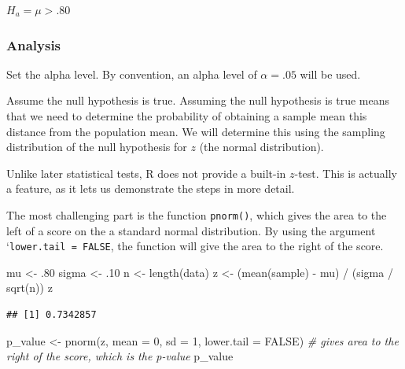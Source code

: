 \documentclass[
]{book}
\newenvironment{Shaded}{\begin{snugshade}}{\end{snugshade}}
\newcommand{\AttributeTok}[1]{\textcolor[rgb]{0.77,0.63,0.00}{#1}}
\newcommand{\CommentTok}[1]{\textcolor[rgb]{0.56,0.35,0.01}{\textit{#1}}}
\newcommand{\ConstantTok}[1]{\textcolor[rgb]{0.00,0.00,0.00}{#1}}
\newcommand{\DecValTok}[1]{\textcolor[rgb]{0.00,0.00,0.81}{#1}}
\newcommand{\FunctionTok}[1]{\textcolor[rgb]{0.00,0.00,0.00}{#1}}
\newcommand{\NormalTok}[1]{#1}
\newcommand{\OtherTok}[1]{\textcolor[rgb]{0.56,0.35,0.01}{#1}}
\newcommand{\SpecialCharTok}[1]{\textcolor[rgb]{0.00,0.00,0.00}{#1}}
\begin{document}
\(H_a = \mu \gt .80\)

\hypertarget{analysis}{%
\subsubsection{Analysis}\label{analysis}}

Set the alpha level. By convention, an alpha level of \(\alpha = .05\) will be used.

Assume the null hypothesis is true. Assuming the null hypothesis is true means that we need to determine the probability of obtaining a sample mean this distance from the population mean. We will determine this using the sampling distribution of the null hypothesis for \(z\) (the normal distribution).

Unlike later statistical tests, R does not provide a built-in \(z\)-test. This is actually a feature, as it lets us demonstrate the steps in more detail.

The most challenging part is the function \texttt{pnorm()}, which gives the area to the left of a score on the a standard normal distribution. By using the argument `\texttt{lower.tail\ =\ FALSE}, the function will give the area to the right of the score.

\begin{Shaded}
\begin{Highlighting}[]
\NormalTok{mu }\OtherTok{\textless{}{-}}\NormalTok{ .}\DecValTok{80}
\NormalTok{sigma }\OtherTok{\textless{}{-}}\NormalTok{ .}\DecValTok{10}
\NormalTok{n }\OtherTok{\textless{}{-}} \FunctionTok{length}\NormalTok{(data)}
\NormalTok{z }\OtherTok{\textless{}{-}}\NormalTok{ (}\FunctionTok{mean}\NormalTok{(sample) }\SpecialCharTok{{-}}\NormalTok{ mu) }\SpecialCharTok{/}\NormalTok{ (sigma }\SpecialCharTok{/} \FunctionTok{sqrt}\NormalTok{(n))}
\NormalTok{z}
\end{Highlighting}
\end{Shaded}

\begin{verbatim}
## [1] 0.7342857
\end{verbatim}

\begin{Shaded}
\begin{Highlighting}[]
\NormalTok{p\_value }\OtherTok{\textless{}{-}} \FunctionTok{pnorm}\NormalTok{(z, }\AttributeTok{mean =} \DecValTok{0}\NormalTok{, }\AttributeTok{sd =} \DecValTok{1}\NormalTok{, }\AttributeTok{lower.tail =} \ConstantTok{FALSE}\NormalTok{) }\CommentTok{\# gives area to the right of the score, which is the p{-}value}
\NormalTok{p\_value}
\end{Highlighting}
\end{Shaded}
\end{document}
